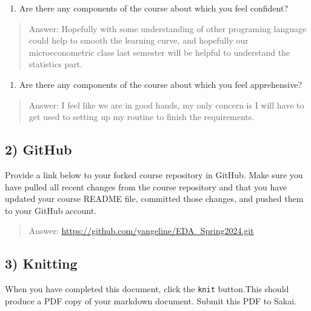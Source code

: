 \documentclass[
]{article}
\providecommand{\tightlist}{%
  \setlength{\itemsep}{0pt}\setlength{\parskip}{0pt}}
\begin{document}
\begin{enumerate}
\def\labelenumi{\arabic{enumi}.}
\setcounter{enumi}{1}
\tightlist
\item
  Are there any components of the course about which you feel confident?
\end{enumerate}

\begin{quote}
Answer: Hopefully with some understanding of other programing language
could help to smooth the learning curve, and hopefully our
microeconometric class last semester will be helpful to understand the
statistics part.
\end{quote}

\begin{enumerate}
\def\labelenumi{\arabic{enumi}.}
\setcounter{enumi}{2}
\tightlist
\item
  Are there any components of the course about which you feel
  apprehensive?
\end{enumerate}

\begin{quote}
Answer: I feel like we are in good hands, my only concern is I will have
to get used to setting up my routine to finish the requirements.
\end{quote}

\hypertarget{github}{%
\subsection{2) GitHub}\label{github}}

Provide a link below to your forked course repository in GitHub. Make
sure you have pulled all recent changes from the course repository and
that you have updated your course README file, committed those changes,
and pushed them to your GitHub account.

\begin{quote}
Answer: \url{https://github.com/yangeline/EDA_Spring2024.git}
\end{quote}

\hypertarget{knitting}{%
\subsection{3) Knitting}\label{knitting}}

When you have completed this document, click the \texttt{knit}
button.This should produce a PDF copy of your markdown document. Submit
this PDF to Sakai.
\end{document}
